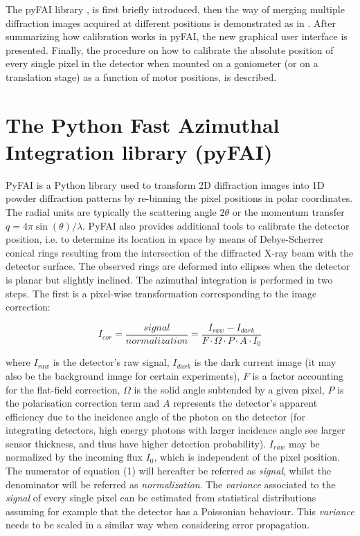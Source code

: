 \documentclass[preprint]{iucr}              %
\begin{document}
The pyFAI library \cite{fv5028}, is first briefly introduced, 
then the way of merging multiple diffraction images
acquired at different positions is demonstrated as in \cite{PyFAI_PDJ}. 
After summarizing how calibration works in pyFAI, the new graphical user
interface is presented.
Finally, the procedure on how to calibrate the absolute position of
every single pixel in the detector when mounted on a goniometer (or on a
translation stage) as a function of motor positions, is
described.

\section{The Python Fast Azimuthal Integration library (pyFAI)}

PyFAI is a Python \cite{python} library used to transform 2D diffraction images into
1D powder diffraction patterns by re-binning the pixel positions in polar
coordinates. 
The radial units are typically the scattering angle  
$2\theta$ or the momentum transfer $q=4\pi \sin(\theta)/\lambda$.
PyFAI also provides additional tools to calibrate the detector position, i.e.
to determine its location in space by means of Debye-Scherrer conical rings
resulting from the intersection of the diffracted X-ray beam with the
detector surface. 
The observed rings are deformed into ellipses when the detector is planar but 
slightly inclined. 
The azimuthal integration is performed in two steps. 
The first is a pixel-wise
transformation corresponding to the image correction:

\begin{equation}
I_{cor} = \frac{signal}{normalization}  = \frac{I_{raw} - I_{dark}}{F \cdot
\Omega \cdot P \cdot A \cdot I_0} 
\end{equation}

where $I_{raw}$ is the detector's raw signal, $I_{dark}$ is the dark current
image (it may also be the background image for certain experiments), $F$ is a 
factor accounting for the flat-field correction, $\Omega$ is the solid
angle subtended by a given pixel, $P$ is the polarisation correction term and
$A$ represents the detector's apparent efficiency due to the incidence angle of the
photon on the detector (for integrating detectors, high energy photons with
larger incidence angle see larger sensor thickness, and thus have higher
detection probability).
$I_{raw}$ may be normalized by the incoming flux $I_0$, which is
independent of the pixel position.
The numerator of equation (1) will hereafter be referred as
\textit{signal}, whilst the denominator will be referred as
\textit{normalization}. 
The \textit{variance} associated to the \textit{signal} of every single pixel can be estimated 
from statistical distributions assuming for example that the detector has a Poissonian behaviour. 
This \textit{variance} needs to be scaled in a similar way when considering error propagation.
\end{document}
